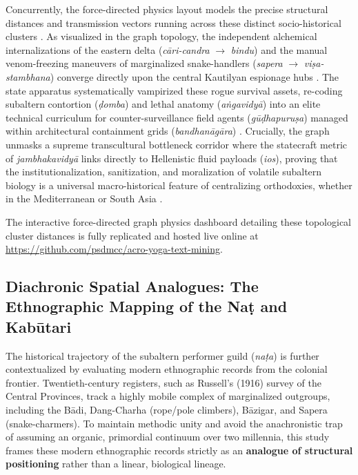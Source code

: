\documentclass[11pt,twoside,letterpaper]{article}
\begin{document}
Concurrently, the force-directed physics layout models the precise structural distances and transmission vectors running across these distinct socio-historical clusters \cite{Lorenzen2011}. As visualized in the graph topology, the independent alchemical internalizations of the eastern delta (\textit{cāri-candra} $\rightarrow$ \textit{bindu}) and the manual venom-freezing maneuvers of marginalized snake-handlers (\textit{sapera} $\rightarrow$ \textit{viṣa-stambhana}) converge directly upon the central Kautilyan espionage hubs \cite{Lorenzen2011, Mallinson2017}. The state apparatus systematically vampirized these rogue survival assets, re-coding subaltern contortion (\textit{ḍomba}) and lethal anatomy (\textit{aṅgavidyā}) into an elite technical curriculum for counter-surveillance field agents (\textit{gūḍhapuruṣa}) managed within architectural containment grids (\textit{bandhanāgāra}) \cite{McCartney2026b}. Crucially, the graph unmasks a supreme transcultural bottleneck corridor where the statecraft metric of \textit{jambhakavidyā} links directly to Hellenistic fluid payloads (\textit{ios}), proving that the institutionalization, sanitization, and moralization of volatile subaltern biology is a universal macro-historical feature of centralizing orthodoxies, whether in the Mediterranean or South Asia \cite{Debnath2024, Lorenzen2011, McCartney2021}.

The interactive force-directed graph physics dashboard detailing these topological cluster distances is fully replicated and hosted live online at \url{https://github.com/psdmcc/acro-yoga-text-mining}.


\subsection{Diachronic Spatial Analogues: The Ethnographic Mapping of the Naṭ and Kabūtari}

The historical trajectory of the subaltern performer guild (\textit{naṭa}) is further contextualized by evaluating modern ethnographic records from the colonial frontier. Twentieth-century registers, such as Russell’s (1916) survey of the Central Provinces, track a highly mobile complex of marginalized outgroups, including the Bādi, Dang-Charha (rope/pole climbers), Bāzigar, and Sapera (snake-charmers). To maintain methodic unity and avoid the anachronistic trap of assuming an organic, primordial continuum over two millennia, this study frames these modern ethnographic records strictly as an \textbf{analogue of structural positioning} rather than a linear, biological lineage. 
\end{document}
